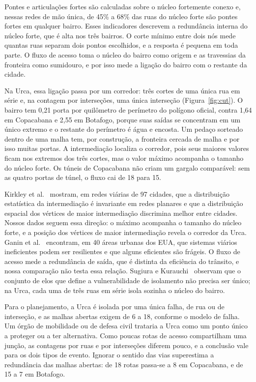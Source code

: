 Pontes e articulações fortes são calculadas sobre o núcleo fortemente
conexo e, nessas redes de mão única, de 45\% a 68\% das ruas do núcleo
forte são pontes fortes em qualquer bairro. Esses indicadores descrevem a
redundância interna do
núcleo forte, que é alta nos três bairros. O corte
mínimo entre dois nós mede quantas ruas separam dois pontos escolhidos, e
a resposta é pequena em toda parte. O fluxo de acesso toma o núcleo do bairro como
origem e as travessias da fronteira como sumidouro, e por isso mede a
ligação do bairro com o restante da cidade.

Na Urca, essa ligação passa por um corredor: três cortes de uma única rua
em série e, na contagem por interseções, uma única interseção
(Figura~\ref{fig:cut}). O bairro tem 0,21 porta por quilômetro de
perímetro do polígono oficial, contra 1,64 em Copacabana e 2,55 em
Botafogo, porque suas saídas se concentram em um único extremo e o
restante do perímetro é água e encosta. Um pedaço sorteado dentro de uma
malha tem, por construção, a fronteira cercada de malha e por isso muitas
portas. A intermediação localiza o corredor, pois seus maiores valores
ficam nos extremos dos três cortes, mas o valor máximo acompanha o
tamanho do núcleo forte. Os túneis de Copacabana não criam um gargalo
comparável: sem as quatro portas de túnel, o fluxo cai de 18 para 15.

Kirkley et al.~\cite{kirkley2018betweenness} mostram, em redes viárias de
97 cidades, que a distribuição estatística da intermediação é invariante
em redes planares e que a distribuição espacial dos vértices de maior
intermediação discrimina melhor entre cidades. Nossos dados seguem essa
direção: o máximo acompanha o tamanho do núcleo forte, e a posição dos vértices
de maior intermediação revela o corredor da Urca. Ganin et
al.~\cite{ganin2017resilience} encontram, em 40 áreas urbanas dos EUA,
que sistemas viários ineficientes podem ser resilientes e que alguns
eficientes são frágeis. O fluxo de acesso mede a redundância de saída,
que é distinta da eficiência do trânsito, e nossa comparação não testa
essa relação. Sugiura e Kurauchi~\cite{sugiura2023isolation} observam que
o conjunto de elos que define a vulnerabilidade de isolamento não precisa
ser único; na Urca, cada uma de três ruas em série isola sozinha
o núcleo do bairro.

Para o planejamento, a Urca é isolada por uma única falha, de rua ou de
interseção, e as malhas abertas exigem de 6 a 18, conforme o modelo de
falha. Um órgão de mobilidade ou de defesa civil trataria a Urca como um
ponto único a proteger ou a ter alternativa. Como poucas rotas de acesso
compartilham uma junção, as contagens por ruas e por interseções diferem
pouco, e a conclusão vale para os dois tipos de evento. Ignorar o sentido
das vias superestima a redundância das malhas abertas: de 18 rotas passa-se
a 8 em Copacabana, e de 15 a 7 em Botafogo.

